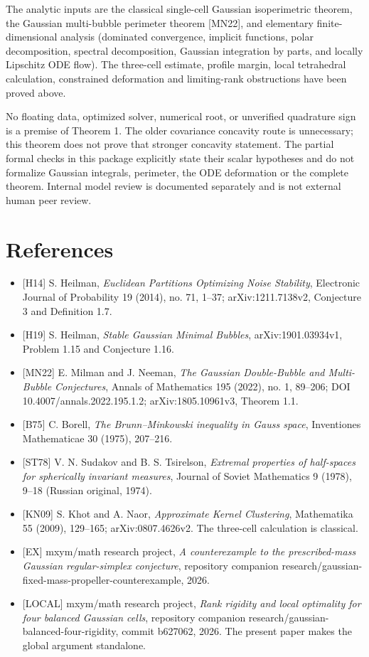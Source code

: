 \documentclass[
  11pt,
]{article}
\providecommand{\tightlist}{%
  \setlength{\itemsep}{0pt}\setlength{\parskip}{0pt}}
\begin{document}
The analytic inputs are the classical single-cell Gaussian isoperimetric
theorem, the Gaussian multi-bubble perimeter theorem {[}MN22{]}, and
elementary finite-dimensional analysis (dominated convergence, implicit
functions, polar decomposition, spectral decomposition, Gaussian
integration by parts, and locally Lipschitz ODE flow). The three-cell
estimate, profile margin, local tetrahedral calculation, constrained
deformation and limiting-rank obstructions have been proved above.

No floating data, optimized solver, numerical root, or unverified
quadrature sign is a premise of Theorem 1. The older covariance
concavity route is unnecessary; this theorem does not prove that
stronger concavity statement. The partial formal checks in this package
explicitly state their scalar hypotheses and do not formalize Gaussian
integrals, perimeter, the ODE deformation or the complete theorem.
Internal model review is documented separately and is not external human
peer review.

\section{References}\label{references}

\begin{itemize}
\tightlist
\item
  {[}H14{]} S. Heilman, \emph{Euclidean Partitions Optimizing Noise
  Stability}, Electronic Journal of Probability 19 (2014), no. 71,
  1--37; arXiv:1211.7138v2, Conjecture 3 and Definition 1.7.
\item
  {[}H19{]} S. Heilman, \emph{Stable Gaussian Minimal Bubbles},
  arXiv:1901.03934v1, Problem 1.15 and Conjecture 1.16.
\item
  {[}MN22{]} E. Milman and J. Neeman, \emph{The Gaussian Double-Bubble
  and Multi-Bubble Conjectures}, Annals of Mathematics 195 (2022), no.
  1, 89--206; DOI 10.4007/annals.2022.195.1.2; arXiv:1805.10961v3,
  Theorem 1.1.
\item
  {[}B75{]} C. Borell, \emph{The Brunn--Minkowski inequality in Gauss
  space}, Inventiones Mathematicae 30 (1975), 207--216.
\item
  {[}ST78{]} V. N. Sudakov and B. S. Tsirelson, \emph{Extremal
  properties of half-spaces for spherically invariant measures}, Journal
  of Soviet Mathematics 9 (1978), 9--18 (Russian original, 1974).
\item
  {[}KN09{]} S. Khot and A. Naor, \emph{Approximate Kernel Clustering},
  Mathematika 55 (2009), 129--165; arXiv:0807.4626v2. The three-cell
  calculation is classical.
\item
  {[}EX{]} mxym/math research project, \emph{A counterexample to the
  prescribed-mass Gaussian regular-simplex conjecture}, repository
  companion research/gaussian-fixed-mass-propeller-counterexample, 2026.
\item
  {[}LOCAL{]} mxym/math research project, \emph{Rank rigidity and local
  optimality for four balanced Gaussian cells}, repository companion
  research/gaussian-balanced-four-rigidity, commit b627062, 2026. The
  present paper makes the global argument standalone.
\end{itemize}
\end{document}
